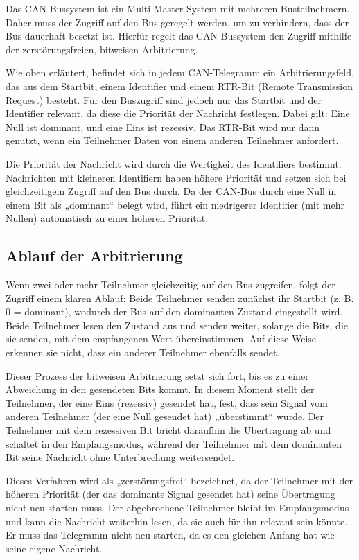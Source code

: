 Das CAN-Bussystem ist ein Multi-Master-System mit mehreren Busteilnehmern. 
Daher muss der Zugriff auf den Bus geregelt werden, um zu verhindern, 
dass der Bus dauerhaft besetzt ist. 
Hierfür regelt das CAN-Bussystem den Zugriff mithilfe der zerstörungsfreien, bitweisen Arbitrierung.

Wie oben erläutert, befindet sich in jedem CAN-Telegramm ein Arbitrierungsfeld, das aus dem Startbit, 
einem Identifier und einem RTR-Bit (Remote Transmission Request) besteht. 
Für den Buszugriff sind jedoch nur das Startbit und der Identifier relevant, da diese die Priorität 
der Nachricht festlegen. Dabei gilt: Eine Null ist dominant, und eine Eins ist rezessiv. 
Das RTR-Bit wird nur dann genutzt, wenn ein Teilnehmer Daten von einem anderen Teilnehmer anfordert.

Die Priorität der Nachricht wird durch die Wertigkeit des Identifiers bestimmt. 
Nachrichten mit kleineren Identifiern haben höhere Priorität und setzen sich bei gleichzeitigem 
Zugriff auf den Bus durch. Da der CAN-Bus durch eine Null in einem Bit als „dominant“ belegt wird, 
führt ein niedrigerer Identifier (mit mehr Nullen) automatisch zu einer höheren Priorität.

\subsection{Ablauf der Arbitrierung}
Wenn zwei oder mehr Teilnehmer gleichzeitig auf den Bus zugreifen, 
folgt der Zugriff einem klaren Ablauf: Beide Teilnehmer senden zunächst ihr 
Startbit (z. B. 0 = dominant), wodurch der Bus auf den dominanten Zustand eingestellt wird. 
Beide Teilnehmer lesen den Zustand aus und senden weiter, solange die Bits, die sie senden, 
mit dem empfangenen Wert übereinstimmen. Auf diese Weise erkennen sie nicht, 
dass ein anderer Teilnehmer ebenfalls sendet.

Dieser Prozess der bitweisen Arbitrierung setzt sich fort, bis es zu einer Abweichung in den 
gesendeten Bits kommt. In diesem Moment stellt der Teilnehmer, der eine Eins (rezessiv) gesendet hat, 
fest, dass sein Signal vom anderen Teilnehmer (der eine Null gesendet hat) „überstimmt“ wurde. 
Der Teilnehmer mit dem rezessiven Bit bricht daraufhin die Übertragung ab und schaltet in den 
Empfangsmodus, während der Teilnehmer mit dem dominanten Bit seine Nachricht ohne Unterbrechung 
weitersendet.

Dieses Verfahren wird als „zerstörungsfrei“ bezeichnet, 
da der Teilnehmer mit der höheren Priorität (der das dominante Signal gesendet hat) seine 
Übertragung nicht neu starten muss. Der abgebrochene Teilnehmer bleibt im Empfangsmodus und 
kann die Nachricht weiterhin lesen, da sie auch für ihn relevant sein könnte. 
Er muss das Telegramm nicht neu starten, da es den gleichen Anfang hat wie seine eigene Nachricht.


